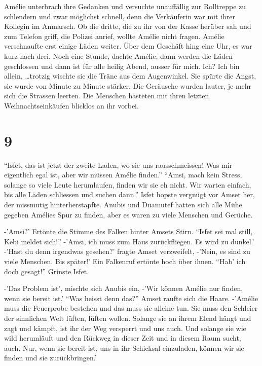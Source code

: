 \documentclass[11pt,titlepage,a5paper]{book}
\begin{document}
Amélie unterbrach ihre Gedanken und versuchte unauffällig zur Rolltreppe zu schlendern und zwar möglichst schnell, denn die Verkäuferin war mit ihrer Kollegin im Anmarsch. Ob die dritte, die zu ihr von der Kasse herüber sah und zum Telefon griff, die Polizei anrief, wollte Amélie nicht fragen. Amélie verschnaufte erst einige Läden weiter. Über dem Geschäft hing eine Uhr, es war kurz nach drei. Noch eine Stunde, dachte Amélie, dann werden die Läden geschlossen und dann ist für alle heilig Abend, ausser für mich. Ich? Ich bin allein, \dots trotzig wischte sie die Träne aus dem Augenwinkel. Sie spürte die Angst, sie wurde von Minute zu Minute stärker. Die Geräusche wurden lauter, je mehr sich die Strassen leerten. Die Menschen hasteten mit ihren letzten Weihnachtseinkäufen blicklos an ihr vorbei. 

\section*{9}


"`Isfet, das ist jetzt der zweite Laden, wo sie uns rausschmeissen! Was mir eigentlich egal ist, aber wir müssen Amélie finden."' "`Amsi, mach kein Stress, solange so viele Leute herumlaufen, finden wir sie eh nicht. Wir warten einfach, bis alle Läden schliessen und suchen dann."' Isfet hopste vergnügt vor Amset her, der missmutig hinterherstapfte. Anubis und Duamutef hatten sich alle Mühe gegeben Amélies Spur zu finden, aber es waren zu viele Menschen und Gerüche.

-'Amsi?' Ertönte die Stimme des Falken hinter Amsets Stirn. "`Isfet sei mal still, Kebi meldet sich!"' -'Amsi, ich muss zum Haus zurückfliegen. Es wird zu dunkel.' -'Hast du denn irgendwas gesehen?' fragte Amset verzweifelt, -'Nein, es sind zu viele Menschen. Bis später!' Ein Falkenruf ertönte hoch über ihnen. "`Hab' ich doch gesagt!"' Grinste Isfet.

-'Das Problem ist', mischte sich Anubis ein, -'Wir können Amélie nur finden, wenn sie bereit ist.' "`Was heisst denn das?"' Amset raufte sich die Haare. -'Amélie muss die Feuerprobe bestehen und das muss sie alleine tun. Sie muss den Schleier der sinnlichen Welt lüften, lüften wollen. Solange sie an ihrem Elend hängt und zagt und kämpft, ist ihr der Weg versperrt und uns auch. Und solange sie wie wild herumläuft und den Rückweg in dieser Zeit und in diesem Raum sucht, auch. Nur, wenn sie bereit ist, uns in ihr Schicksal einzuladen, können wir sie finden und sie zurückbringen.'
\end{document}
